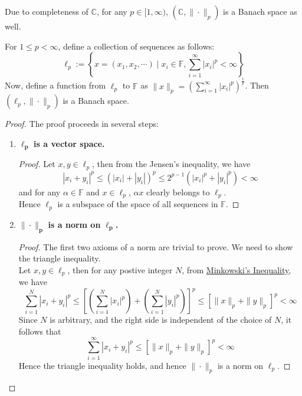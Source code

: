 \begin{note}
    Due to completeness of $\mathbb{C}$, for any $p\in[1,\infty)$, $(\mathbb{C},\|\cdot\|_{p})$ is a Banach space as well.
\end{note}
\vspace{0.4cm}
\begin{eg}
    For $1\leq p<\infty$, define a collection of sequences as follows:$$\ell_{p}:=\left\{x=(x_{1},x_{2},\cdots)\mid x_{i}\in\mathbb{F}, \sum_{i=1}^{\infty}|x_{i}|^{p}<\infty\right\}$$
    Now, define a function from $\ell_{p}$ to $\mathbb{F}$ as $\|x\|_{p}=\left(\sum_{i=1}^{\infty}|x_{i}|^{p}\right)^{\frac{1}{p}}$. Then $(\ell_{p},\|\cdot\|_{p})$ is a Banach space.
    \begin{proof} The proof proceeds in several steps:
        \begin{enumerate}
            \item $\bm{\ell_{p}}$ \textbf{is a vector space.} 
                \begin{proof}
                    Let $x,y\in\ell_{p}$, then from the Jensen's inequality, we have $$|x_{i}+y_{i}|^{p}\leq(|x_{i}|+|y_{i}|)^{p}\leq 2^{p-1}(|x_{i}|^{p}+|y_{i}|^{p})<\infty$$
                    and for any $\alpha\in \mathbb{F}$ and $x\in\ell_{p}$, $\alpha x$ clearly belongs to $\ell_{p}$.\\ 
                    Hence $\ell_{p}$ is a subspace of the space of all sequences in $\mathbb{F}$.
                \end{proof}
            \item $\bm{\|\cdot\|_{p}}$\textbf{ is a norm on }$\bm{\ell_{p}}$\textbf{.}
                \begin{proof}
                    The first two axioms of a norm are trivial to prove. We need to show the triangle inequality.\\ 
                    Let $x,y\in\ell_{p}$, then for any postive integer $N$, from \hyperlink{minkowski}{Minkowski's Inequality}, we have $$\sum_{i=1}^{N}|x_{i}+y_{i}|^{p}\leq\left[\left(\sum_{i=1}^{N}|x_{i}|^{p}\right)+\left(\sum_{i=1}^{N}|y_{i}|^{p}\right)\right]^{p}\leq\left[\|x\|_{p}+\|y\|_{p}\right]^{p}<\infty$$
                    Since $N$ is arbitrary, and the right side is independent of the choice of $N$, it follows that $$\sum_{i=1}^{\infty}|x_{i}+y_{i}|^{p}\leq\left[\|x\|_{p}+\|y\|_{p}\right]^{p}<\infty$$
                    Hence the triangle inequality holds, and hence $\|\cdot\|_{p}$ is a norm on $\ell_{p}$.
                \end{proof}

\end{enumerate}
\end{proof}
\end{eg}
